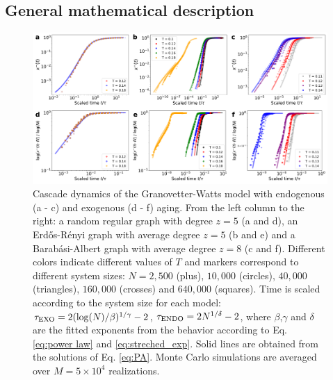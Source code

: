 \subsection{\label{subsec:Approximate master equation and solutions} General mathematical description}

\begin{figure}[t]
    \centering \captionsetup{font=sf}
    \includegraphics[width=\linewidth]{Figs/Aging_Threshold/FIG_EVO_EXO_ENDO.pdf}
    \caption[Cascade dynamics of the Granovetter-Watts model in graphs]{\label{fig:exo_endo_evo} Cascade dynamics of the Granovetter-Watts model with endogenous (a - c) and exogenous (d - f) aging. From the left column to the right: a random regular graph with degree $z=5$ (a and d), an Erd\H{o}s-R\'enyi graph with average degree $z = 5$ (b and e) and a Barab\'asi-Albert graph with average degree $z = 8$ (c and f). Different colors indicate different values of $T$ and markers correspond to different system sizes: $N = 2,500$ (plus), $10,000$ (circles), $40,000$ (triangles), $160,000$ (crosses) and $640,000$ (squares). Time is scaled according to the system size for each model: $\tau_{\rm{EXO}} = 2(\log(N)/\beta)^{1/\gamma} - 2$, $\tau_{\rm{ENDO}} = 2N^{1/\delta} - 2$, where $\beta$,$\gamma$ and $\delta$ are the fitted exponents from the behavior according to Eq. \eqref{eq:power law} and \eqref{eq:streched_exp}. Solid lines are obtained from the solutions of Eq. \eqref{eq:PA}. Monte Carlo simulations are averaged over $M = 5 \times 10^4$ realizations.}
\end{figure}

